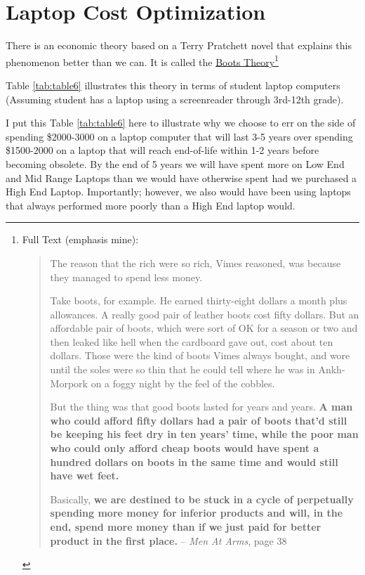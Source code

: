 \documentclass[14pt,letterpaper,twoside]{extreport}
\renewenvironment{leftbar}[1][\hsize]
{%
    \def\FrameCommand{%
        {\color{gray!25}\vrule width 10pt}%
        \hspace{0pt}
        \fboxsep=\FrameSep\colorbox{gray!5}%
    }%
    \MakeFramed{\hsize#1\advance\hsize-\width\FrameRestore}%
}
{\endMakeFramed}
\begin{document}
\pagebreak	\hypertarget{optimizing-cost-with-performance}{}\section{Laptop Cost Optimization}\label{optimizing-cost-with-performance}

There is an economic theory based on a Terry Pratchett novel that explains this phenomenon better than we can. It is called the \href{https://en.wikipedia.org/wiki/Boots_theory}{Boots Theory}\footnote{Full Text (emphasis mine):
	\begin{leftbar}
		\begin{quote}The reason that the rich were so rich, Vimes reasoned, was because they managed to spend less money.

			Take boots, for example. He earned thirty-eight dollars a month plus allowances. A really good pair of leather boots cost fifty dollars. But an affordable pair of boots, which were sort of OK for a season or two and then leaked like hell when the cardboard gave out, cost about ten dollars. Those were the kind of boots Vimes always bought, and wore until the soles were so thin that he could tell where he was in Ankh-Morpork on a foggy night by the feel of the cobbles.

			But the thing was that good boots lasted for years and years. \textbf{A man who could afford fifty dollars had a pair of boots that’d still be keeping his feet dry in ten years’ time, while the poor man who could only afford cheap boots would have spent a hundred dollars on boots in the same time and would still have wet feet.}

			Basically, \textbf{we are destined to be stuck in a cycle of perpetually spending more money for inferior products and will, in the end, spend more money than if we just paid for better product in the first place.} -- \textit{Men At Arms}, page 38
		\end{quote}
	\end{leftbar} 
 }

\hfill \break Table \ref{tab:table6} illustrates this theory in terms of student laptop computers (Assuming student has a laptop using a screenreader through 3rd-12th grade).

I put this Table \ref{tab:table6} here to illustrate why we choose to err on the side of spending \$2000-3000 on a laptop computer that will last 3-5 years over spending \$1500-2000 on a laptop that will reach end-of-life within 1-2 years before becoming obsolete. By the end of 5 years we will have spent more on Low End and Mid Range Laptops than we would have otherwise spent had we purchased a High End Laptop. Importantly; however, we also would have been using laptops that always performed more poorly than a High End laptop would.
\end{document}
